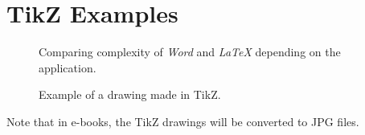 

\chapter{TikZ Examples}
\label{tikz-examples:cha}

\begin{figure}
\centering

\caption{Comparing complexity of \textit{Word} and \textit{LaTeX} depending on the application.}
\end{figure}

\begin{figure}
\centering

\caption{Example of a drawing made in TikZ.}
\end{figure}

Note that in e-books, the TikZ drawings will be converted to JPG files.
